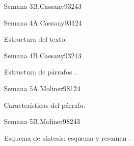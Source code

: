 \begin{syllabus}
\begin{unit}{Semana 3B.}{Cassany93}{24}{3}
   \begin{unitgoals}
      \item 
      \item
      \item 
      \end{unitgoals}
\end{unit}

\begin{unit}{Semana 4A.}{Cassany93}{12}{4}
   \begin{topics}
      \item Estructura del texto.
   \end{topics}
   \begin{unitgoals}
      \item 
   \end{unitgoals}
\end{unit}

\begin{unit}{Semana 4B.}{Cassany93}{24}{3}
   \begin{topics}
      \item Estructura de párrafos .
   \end{topics}

   \begin{unitgoals}
      \item 
      \item
      \item 
      \end{unitgoals}
\end{unit}

\begin{unit}{Semana 5A.}{Moliner98}{12}{4}
   \begin{topics}
      \item Características del párrafo.
   \end{topics}
   \begin{unitgoals}
      \item 
   \end{unitgoals}
\end{unit}

\begin{unit}{Semana 5B.}{Moliner98}{24}{3}
   \begin{topics}
      \item Esquema de síntesis: esquema y resumen .
   \end{topics}

   \begin{unitgoals}
      \item 
      \item
      \item 
      \end{unitgoals}
\end{unit}


\end{syllabus}
